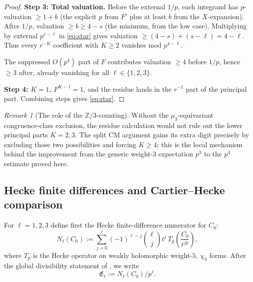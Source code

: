 \documentclass[11pt]{amsart}
\theoremstyle{definition}
\theoremstyle{remark}
\newtheorem{remark}[theorem]{Remark}
\begin{document}
\begin{proof}
\medskip\noindent\textbf{Step 3: Total valuation.}\quad
Before the external $1/p$, each integrand has $p$-valuation $\ge 1+b$ (the explicit $p$ from $F'$ plus at least $b$ from the $X$-expansion). After $1/p$, valuation $\ge b\ge 4-s$ (the minimum, from the low case). Multiplying by external $p^{s-\ell}$ in \eqref{eq:star} gives valuation $\ge (4-s)+(s-\ell)=4-\ell$. Thus every $r^{-K}$ coefficient with $K\ge 2$ vanishes mod $p^{4-\ell}$.

The suppressed $O(p^4)$ part of $F$ contributes valuation $\ge 4$ before $1/p$, hence $\ge 3$ after, already vanishing for all $\ell\in\{1,2,3\}$.

\medskip\noindent\textbf{Step 4: $K=1$.}\quad
$F^{K-1}=1$, and the residue lands in the $r^{-1}$ part of the principal part. Combining steps gives \eqref{eq:star}.
\end{proof}

\begin{remark}[The role of the $\mathbb Z/3$-counting]
Without the $\mu_3$-equivariant congruence-class exclusion, the residue calculation would not rule out the lower principal parts $K=2,3$. The split CM argument gains its extra digit precisely by excluding those two possibilities and forcing $K\ge 4$; this is the local mechanism behind the improvement from the generic weight-$3$ expectation $p^3$ \cite{RRV} to the $p^4$ estimate proved here.
\end{remark}

\subsection{Hecke finite differences and Cartier--Hecke comparison}\label{subsec:hecke-finite-differences}

For $\ell=1,2,3$ define first the Hecke finite-difference numerator for $C_0$:
\begin{equation}\label{eq:hecke-fd-numerator}
N_\ell(C_0):=\sum_{j=0}^\ell(-1)^{\ell-j}\binom{\ell}{j}t^j\,T_p\!\left(\frac{C_0}{t^{jp}}\right),
\end{equation}
where $T_p$ is the Hecke operator on weakly holomorphic weight-$5$, $\chi_3$ forms. After the global divisibility statement of , we write
\begin{equation}\label{eq:hecke-fd}
\mathfrak E_\ell:=N_\ell(C_0)/p^\ell.
\end{equation}
\end{document}
